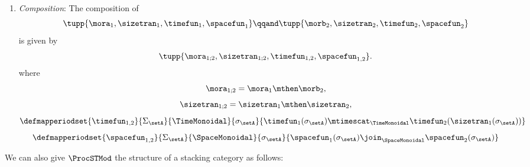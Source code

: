 \begin{definition}
\begin{enumerate}
		\item \emph{Composition}: The composition of
		      \begin{equation}
			      \tupp{\mora_1, \sizetran_1,  \timefun_1 , \spacefun_1 }
			      \qqand
			      \tupp{\morb_2, \sizetran_2,  \timefun_2 , \spacefun_2 }
		      \end{equation}
		      is given by
		      \begin{equation}
			      \tupp{
				      \mora_{1;2},
				      \sizetran_{1;2},
				      \timefun_{1,2},
				      \spacefun_{1,2}
			      }.
		      \end{equation}
		      where
		      \begin{equation}
			      \mora_{1;2} = \mora_1 \mthen \morb_2,
		      \end{equation}
		      \begin{equation}
			      \sizetran_{1;2} = \sizetran_1 \mthen \sizetran_2,
		      \end{equation}
		      \begin{equation}
			      \defmapperiodset{
				      \timefun_{1,2}
			      }{
				      \Sigma_{\setA}
			      }{
				      \TimeMonoidal
			      }{
				      \sigma_{\setA}
			      }{
				      \timefun_1(\sigma_{\setA}) \mtimescat_{\TimeMonoidal} \timefun_2(\sizetran_1(\sigma_{\setA}))
			      }
		      \end{equation}
		      \begin{equation}
			      \defmapperiodset{
				      \spacefun_{1,2}
			      }{
				      \Sigma_{\setA}
			      }{
				      \SpaceMonoidal
			      }{
				      \sigma_{\setA}
			      }{
				      \spacefun_1(\sigma_{\setA}) \join_{\SpaceMonoidal} \spacefun_2(\sigma_{\setA})
			      }
		      \end{equation}
	\end{enumerate}
\end{definition}

We can also give $\ProcSTMod$ the structure of a stacking category as follows:

